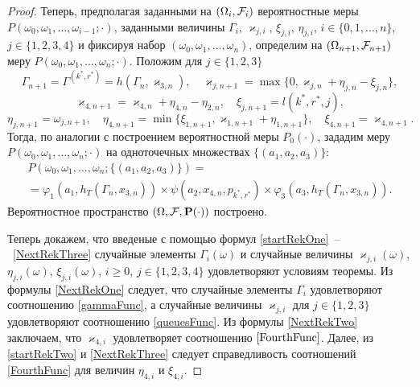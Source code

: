 \documentclass[a4paper,12pt,russian]{extarticle}
\newcommand{\ml}[1]{\begin{multline}#1\end{multline}}
\begin{document}
\begin{proof}
Теперь, предполагая заданными на $(\Omega_i, {\cal F}_i)$ вероятностные меры $P(\omega_0, \omega_1, \ldots, \omega_{i-1};\cdot)$, заданными величины $\Gamma_i$, $\varkappa_{j,i}$, $\xi_{j,i}$, $\eta_{j,i}$, $i\in \{0,1,\ldots,n\}$, $j\in \{1, 2, 3, 4\}$ и фиксируя набор $(\omega_0, \omega_1, \ldots, \omega_{n})$, определим на $(\Omega_{n+1}, {\cal F}_{n+1})$ меру $P(\omega_0, \omega_1, \ldots, \omega_n;\cdot)$. Положим для $j\in \{1, 2, 3\}$
\begin{equation}
\Gamma_{n+1}=\Gamma^{(k^*,r^*)}=h(\Gamma_{n},\varkappa_{3,n}), \quad \varkappa_{j,n+1}=\max\{ 0,\varkappa_{j,n}+\eta_{j,n} -\xi_{j,n}\},
\label{NextRekOne}
\end{equation}
\begin{equation}
\varkappa_{4,n+1}=\varkappa_{4,n}+\eta_{4,n}-\eta_{2,n}, \quad \xi_{j,n+1}=l(k^*,r^*,j),
\label{NextRekTwo}
\end{equation}
\begin{equation}
\eta_{j,n+1}=\omega_{j,n+1}, \quad \eta_{4,n+1}=\min\{\xi_{1,n+1}, \varkappa_{1,n+1}+\eta_{1,n+1}\}, \quad \xi_{4,n+1}=\varkappa_{4,n+1}.
\label{NextRekThree}
\end{equation}
Тогда, по аналогии с построением вероятностной меры $P_0(\cdot)$, зададим меру $P(\omega_0,\omega_1,\ldots,\omega_n;\cdot)$ на одноточечных множествах $\{(a_1,a_2,a_3)\}$:
\ml
{
P(\omega_0,\omega_1,\ldots,\omega_n;\{(a_1,a_2,a_3)\}) = \\
= \varphi_1(a_1,h_T(\Gamma_n,x_{3,n})) \times \psi(a_2,x_{4,n}, p_{k^*,r^*}) \times \varphi_3(a_3,h_T(\Gamma_n,x_{3,n})).
\label{probabilitiesTwo}
}
Вероятностное пространство $(\Omega,{\cal F},\Pr(\cdot))$ построено. 

Теперь докажем, что введеные с помощью формул \eqref{startRekOne}~--~\eqref{NextRekThree} случайные элементы $\Gamma_i(\omega)$ и случайные величины $\varkappa_{j,i}(\omega)$, $\eta_{j,i}(\omega)$, $\xi_{j,i}(\omega)$, $i \geqslant 0$, $j \in \{1, 2, 3, 4\}$ удовлетворяют условиям теоремы. Из формулы \eqref{NextRekOne} следует, что случайные элементы $\Gamma_i$ удовлетворяют соотношению \eqref{gammaFunc}, а случайные величины $\varkappa_{j,i}$ для $j\in \{1, 2, 3\}$ удовлетворяют соотношению \eqref{queuesFunc}. Из формулы \eqref{NextRekTwo} заключаем, что $\varkappa_{4,i}$ удовлетворяет соотношению $\eqref{FourthFunc}$. Далее, из \eqref{startRekTwo} и \eqref{NextRekThree} следует справедливость соотношений \eqref{FourthFunc} для величин $\eta_{4,i}$ и $\xi_{4,i}$. 


\end{proof}
\end{document}
